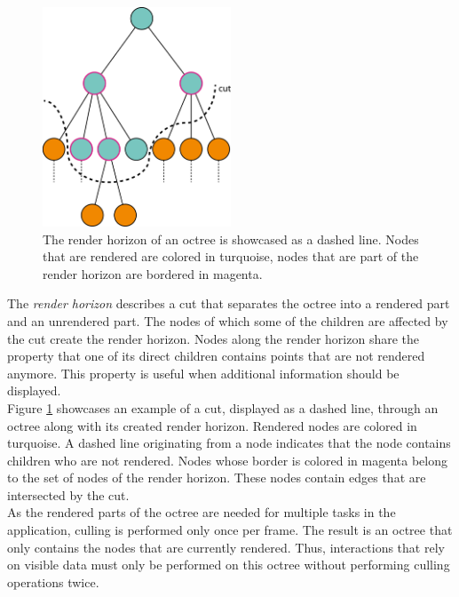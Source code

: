 \begin{figure}
    \centering
    \includegraphics[width=0.5\textwidth]{Octree/renderHorizon.png}
    \caption[Illustration of the render horizon of an octree.]
		{The render horizon of an octree is showcased as a dashed line. Nodes that are rendered are colored in turquoise, nodes that are part of the render horizon are bordered in magenta. }
    \label{fig:renderHorizon}
\end{figure}


The \textit{render horizon} describes a cut that separates the octree into a rendered part and an unrendered part. The nodes of which some of the children are affected by the cut create the render horizon. Nodes along the render horizon share the property that one of its direct children contains points that are not rendered anymore. This property is useful when additional information should be displayed. 
\\
Figure \ref{fig:renderHorizon} showcases an example of a cut, displayed as a dashed line, through an octree along with its created render horizon. Rendered nodes are colored in turquoise. A dashed line originating from a node indicates that the node contains children who are not rendered. Nodes whose border is colored in magenta belong to the set of nodes of the render horizon. These nodes contain edges that are intersected by the cut. 
\\
As the rendered parts of the octree are needed for multiple tasks in the application, culling is performed only once per frame. The result is an octree that only contains the nodes that are currently rendered. Thus, interactions that rely on visible data must only be performed on this octree without performing culling operations twice. 